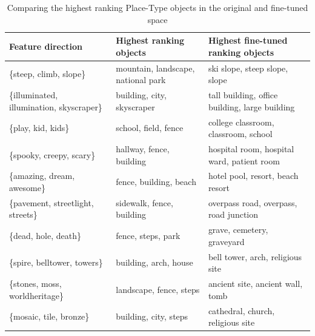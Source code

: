 \begin{table}[t]
	
	\centering
	\setlength{\tabcolsep}{14pt}
	\renewcommand{\arraystretch}{1}
	\scriptsize
	\begin{tabularx}{\textwidth}{l l l}
		\textbf{Feature direction} & Highest ranking objects & Highest fine-tuned ranking objects\\
		\toprule             
		\{steep, climb, slope\}                   & mountain, landscape, national park & ski slope, steep slope, slope                                     \\
		\{illuminated, illumination, skyscraper\} & building, city, skyscraper         & tall building, office building, large building                    \\
		\{play, kid, kids\}                       & school, field, fence               & college classroom, classroom, school                              \\
		\{spooky, creepy, scary\}          & hallway, fence, building             & hospital room, hospital ward, patient room                  \\
		\{amazing, dream, awesome\}                   & fence, building, beach    & hotel pool, resort, beach resort \\
		\{pavement, streetlight, streets\}        & sidewalk, fence, building          & overpass road, overpass, road junction                            \\
		\{dead, hole, death\}                     & fence, steps, park                 & grave, cemetery, graveyard                                        \\
		\{spire, belltower, towers\}              & building, arch, house              & bell tower, arch, religious site                                  \\
		\{stones, moss, worldheritage\}           & landscape, fence, steps            & ancient site, ancient wall, tomb                                  \\
		\{mosaic, tile, bronze\}                  & building, city, steps              & cathedral, church, religious site     \\
	
	\end{tabularx}
	
	\caption{Comparing the highest ranking Place-Type objects in the original and fine-tuned space}\label{tabTopRanked}
\end{table}


